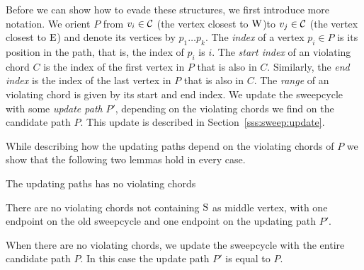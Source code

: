   Before we can show how to evade these structures, we first introduce more notation. We orient $P$ from $v_i \in \mathcal{C}$ (the vertex closest to $\mathrm{W}$)to $v_j \in \mathcal{C}$ (the vertex closest to $\mathrm{E}$) and denote its vertices by $p_1 \ldots p_k$.
  The \emph{index} of a vertex $p_i \in P$ is its position in the path, that is, the index of $p_i$ is $i$.
  The \emph{start index} of an violating chord $C$ is the index of the first vertex in $P$ that is also in $C$. Similarly, the \emph{end index} is the index of the last vertex in $P$ that is also in $C$.
  The \emph{range} of an violating chord is given by its start and end index. We update the sweepcycle with some \emph{update path} $P'$, depending on the violating chords we find on the candidate path $P$. This update is described in Section~\ref{sss:sweep:update}.

  While describing how the updating paths depend on the violating chords of $P$ we show that the following two lemmas hold in every case.

  \begin{lemma}
    The updating paths has no violating chords
    \label{lm:sweep:augNoIregularity}
  \end{lemma}

  \begin{lemma}
    \label{lm:sweep:noConnectingIregularity}
    There are no violating chords not containing $\mathrm{S}$ as middle vertex, with one endpoint on the old sweepcycle and one endpoint on the updating path $P'$.
  \end{lemma}

    When there are no violating chords, we update the sweepcycle with the entire candidate path $P$.
    In this case the update path $P'$ is equal to $P$.

